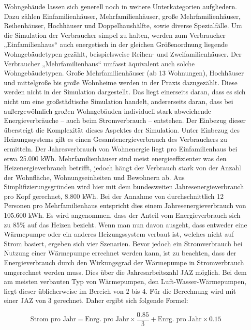 Wohngebäude lassen sich generell noch in weitere Unterkategorien aufgliedern.
Dazu zählen Einfamilienhäuser, Mehrfamilienhäuser, große Mehrfamilienhäuser, Reihenhäuser, Hochhäuser und Doppelhaushälfte, sowie diverse Spezialfälle. 
Um die Simulation der Verbraucher simpel zu halten, werden zum Verbraucher „Einfamilienhaus“ auch energetisch in der gleichen Größenordnung liegende Wohngebäudetypen gezählt, beispielsweise Reihen- und Zweifamilienhäuser. 
Der Verbraucher „Mehrfamilienhaus“ umfasst äquivalent auch solche Wohngebäudetypen. 
Große Mehrfamilienhäuser (ab 13 Wohnungen), Hochhäuser und mittelgroße bis große Wohnheime werden in der Praxis dazugezählt. 
Diese werden nicht in der Simulation dargestellt.
Das liegt einerseits daran, dass es sich nicht um eine großstädtische Simulation handelt, andererseits daran, dass bei außergewöhnlich großen Wohngebäuden individuell stark abweichende Energieverbräuche – auch beim Stromverbrauch – entstehen. 
Der Einbezug dieser übersteigt die Komplexität dieses Aspektes der Simulation.
Unter Einbezug des Heizungssystems gilt es einen Gesamtenergieverbrauch des Verbrauchers zu ermitteln. 
Der Jahresverbrauch von Wohnenergie liegt pro Einfamilienhaus bei etwa 25.000 kWh. 
Mehrfamilienhäuser sind meist energieeffizienter was den Heizenergieverbrauch betrifft, jedoch hängt der Verbrauch stark von der Anzahl der Wohnfläche, Wohnungseinheiten und Bewohnern ab. 
Aus Simplifizierungsgründen wird hier mit dem bundesweiten Jahresenergieverbrauch pro Kopf gerechnet, 8.800 kWh. 
Bei der Annahme von durchschnittlich 12 Personen pro Mehrfamilienhaus entspricht dies einem Jahresenergieverbrauch von 105.600 kWh. 
Es wird angenommen, dass der Anteil vom Energieverbrauch sich zu 85\% auf das Heizen bezieht. 
Wenn man nun davon ausgeht, dass entweder eine Wärmepumpe oder ein anderes Heizungssystem verbaut ist, welches nicht auf Strom basiert, ergeben sich vier Szenarien. 
Bevor jedoch ein Stromverbrauch bei Nutzung einer Wärmepumpe errechnet werden kann, ist zu beachten, dass der Energieverbrauch durch den Wirkungsgrad der Wärmepumpe in Stromverbrauch umgerechnet werden muss. 
Dies über die Jahresarbeitszahl JAZ möglich. 
Bei dem am meisten verbauten Typ von Wärmepumpen, den Luft-Wasser-Wärmepumpen, liegt dieser üblicherweise im Bereich von 2 bis 4. 
Für die Berechnung wird mit einer JAZ von 3 gerechnet. Daher ergibt sich folgende Formel:

\begin{equation}
    \text{Strom pro Jahr} = \text{Enrg. pro Jahr} \times \frac{0.85}{3} + \text{Enrg. pro Jahr} \times 0.15
\end{equation}

